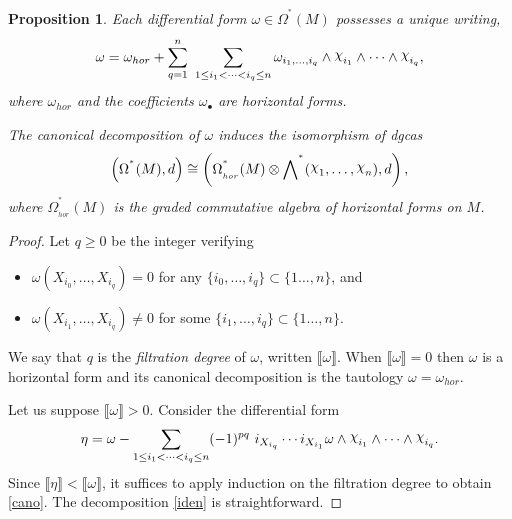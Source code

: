 \documentclass[a4paper,oneside,10pt,reqno]{amsart}
\newtheorem{proposition}[theorem]{Proposition}
\theoremstyle{definition}
\newcommand\chii{\raise2pt\hbox{$\chi$}}
\newcommand\Om{\Omega}
\newcommand\om{\omega}
\newcommand{\bi}[2]{{#1}^{^{#2}}}
\newcommand{\lau}[4]{{#1}^{^{#2}}_{_{#3}}{\left( #4 \right)}}
\newcommand{\coho}[3]{{#1}^{^{#2}}{\left( #3 \right)}}
\begin{document}
\begin{proposition}\label{P1}
Each differential form $\om \in
\lau{\Om}{*}{}{ M }$ possesses a unique writing,
\begin{equation}\label{cano}
\om = \omega_{hor} + \sum_{q=1}^n \ \sum_{1\leq i_1 < \cdots < i_q\leq n } \om_{i_1, \ldots,i_q}  \wedge \chii_{i_1} \wedge \cdots \wedge \chii_{i_q},
\end{equation}
where $\omega_{hor}$ and the coefficients $  {\omega_\bullet } $ are   horizontal forms.

The {\em canonical decomposition} of $\om$ induces the isomorphism of dgcas
\begin{equation}\label{iden}
\left(\coho \Om * M,d\right)  \cong \left(\lau \Om *{hor} M \otimes \bi \bigwedge *(\chii_1, \ldots,\chii_n),d\right),
\end{equation}
where  $\lau \Om *{hor}  M$  is the graded commutative algebra of horizontal forms on $M$.
\end{proposition}




\begin{proof}
Let $q\geq 0$ be the integer verifying 
\begin{itemize}
\item $\omega (X_{i_0}, \ldots ,X_{i_q}) =0$ for any $\{i_0, \ldots, i_q\} \subset \{1 \ldots,n\}$, and
\item $\omega (X_{i_1}, \ldots ,X_{i_q}) \ne 0$ for some $\{i_1, \ldots, i_q\} \subset \{1 \ldots,n\}$.
\end{itemize}
We say that $q$ is the {\em filtration degree} of $\omega$, written $\llbracket \omega \rrbracket$.
When $\llbracket \omega \rrbracket=0$ then $\omega$ is a horizontal form and its canonical decomposition is the tautology $\omega = \omega_{hor}$.

Let us suppose $\llbracket \omega\rrbracket >0$. Consider the differential form
$$
\eta = \om -  \sum_{1\leq i_1 < \cdots < i_q\leq n } (-1)^{pq} \  i_{X_{i_q}} \cdots i_{X_{i_1}} \om  \wedge \chii_{i_1} \wedge \cdots \wedge \chii_{i_q}.
$$
Since $\llbracket \eta\rrbracket  < \llbracket \omega\rrbracket $, it suffices to apply induction  on the filtration degree to obtain \eqref{cano}. The decomposition \eqref{iden} is straightforward.
\end{proof}
\end{document}
